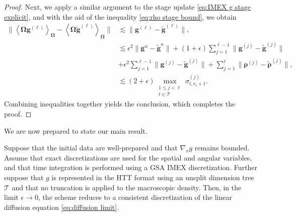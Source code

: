 \documentclass[onefignum,onetabnum]{siamart220329}
\begin{document}
\begin{proof}
    Next, we apply a similar argument to the stage update \eqref{eq:IMEX g stage explicit}, and with the aid of the inequality \eqref{eq:rho stage bound}, we obtain
    \begin{align*}
        \Big\lVert \left\langle \mathbf{\Omega} \mathbf{g}^{(\ell)} \right\rangle_{\mathbf{\Omega}} - \left\langle \mathbf{\Omega}\widetilde{\mathbf{g}}^{(\ell)} \right\rangle_{\mathbf{\Omega}} \Big\rVert &\lesssim \Big\lVert \mathbf{g}^{(\ell)} - \widetilde{\mathbf{g}}^{(\ell)} \Big\rVert, \\
        & \lesssim \epsilon^{2}  \Big\lVert \mathbf{g}^{n} - \widetilde{\mathbf{g}}^{n} \Big\rVert + (1 + \epsilon) \sum_{j=1}^{\ell-1} \Big\lVert \mathbf{g}^{(j)} - \widetilde{\mathbf{g}}^{(j)} \Big\rVert \\ &+ \epsilon^{2} \sum_{j=1}^{\ell-1}  \Big\lVert \mathbf{g}^{(j)} - \widetilde{\mathbf{g}}^{(j)} \Big\rVert + \sum_{j=1}^{\ell}\Big\lVert \boldsymbol{\rho}^{(j)} - \widetilde{\boldsymbol{\rho}}^{(j)} \Big\rVert, \\
        & \lesssim (2 + \epsilon) \max_{\substack{1 \leq j < \ell \\ t \in \mathcal{T}}} \sigma_{t,r_{t}+1}^{(j)}.
    \end{align*}
    Combining inequalities together yields the conclusion, which completes the proof.
\end{proof}


We are now prepared to state our main result.
\begin{theorem}
\label{thm:AP property with HTT}
Suppose that the initial data are well-prepared and that $\nabla_{x}g$ remains bounded. Assume that exact discretizations are used for the spatial and angular variables, and that time integration is performed using a GSA IMEX discretization. Further suppose that $g$ is represented in the HTT format using an unsplit dimension tree $\mathcal{T}$ and that no truncation is applied to the macroscopic density. Then, in the limit $\epsilon \rightarrow 0$, the scheme reduces to a consistent discretization of the linear diffusion equation \eqref{eq:diffusion limit}.
\end{theorem}
\end{document}

